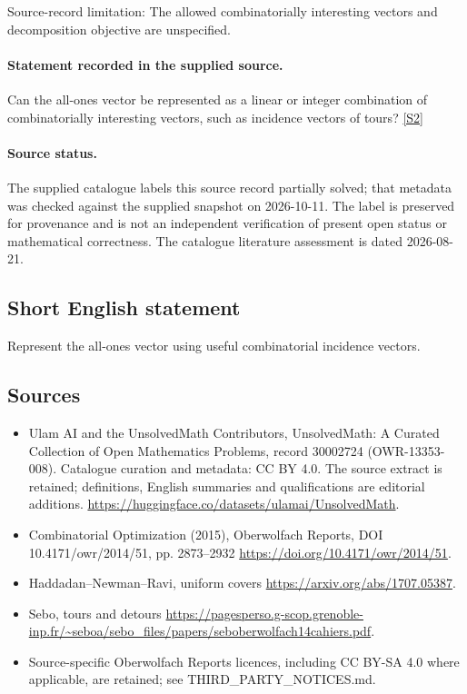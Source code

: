 \documentclass[11pt]{article}
\begin{document}
Source-record limitation: The allowed combinatorially interesting vectors and decomposition objective are unspecified.
\paragraph{Statement recorded in the supplied source.}
Can the all-ones vector be represented as a linear or integer combination of combinatorially interesting vectors, such as incidence vectors of tours? \href{https://doi.org/10.4171/owr/2014/51}{[S2]}
\paragraph{Source status.}
The supplied catalogue labels this source record partially solved; that metadata was checked against the supplied snapshot on 2026-10-11. The label is preserved for provenance and is not an independent verification of present open status or mathematical correctness. The catalogue literature assessment is dated 2026-08-21.
\subsection{Short English statement}
Represent the all-ones vector using useful combinatorial incidence vectors.
\subsection{Sources}
\begin{itemize}
\item[S1] Ulam AI and the UnsolvedMath Contributors, UnsolvedMath: A Curated Collection of Open Mathematics Problems, record 30002724 (OWR-13353-008). Catalogue curation and metadata: CC BY 4.0. The source extract is retained; definitions, English summaries and qualifications are editorial additions.
\url{https://huggingface.co/datasets/ulamai/UnsolvedMath}.
\item[S2] Combinatorial Optimization (2015), Oberwolfach Reports, DOI 10.4171/owr/2014/51, pp. 2873--2932
\url{https://doi.org/10.4171/owr/2014/51}.
\item[S3] Haddadan--Newman--Ravi, uniform covers
\url{https://arxiv.org/abs/1707.05387}.
\item[S4] Sebo, tours and detours
\url{https://pagesperso.g-scop.grenoble-inp.fr/~seboa/sebo_files/papers/seboberwolfach14cahiers.pdf}.
\item Source-specific Oberwolfach Reports licences, including CC BY-SA 4.0 where applicable, are retained; see THIRD\_PARTY\_NOTICES.md.
\end{itemize}
\end{document}
